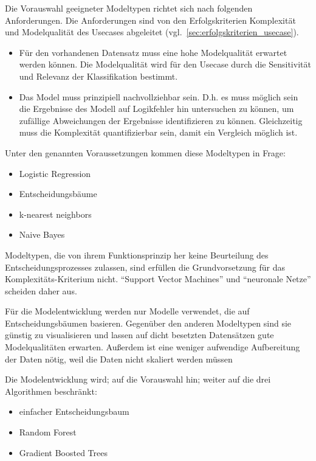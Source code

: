 Die Vorauswahl geeigneter Modeltypen richtet sich nach folgenden Anforderungen. Die Anforderungen sind von den Erfolgskriterien Komplexität und Modelqualität des Usecases abgeleitet (vgl.~\cref{sec:erfolgskriterien_usecase}).

\begin{itemize}
    \item Für den vorhandenen Datensatz muss eine hohe Modelqualität erwartet werden können. Die Modelqualität wird für den Usecase durch die Sensitivität und Relevanz der Klassifikation bestimmt.
    \item Das Model muss prinzipiell nachvollziehbar sein. D.h. es muss möglich sein die Ergebnisse des Modell auf Logikfehler hin untersuchen zu können, um zufällige Abweichungen der Ergebnisse identifizieren zu können. Gleichzeitig muss die Komplexität quantifizierbar sein, damit ein Vergleich möglich ist.
\end{itemize}

Unter den genannten Voraussetzungen kommen diese Modeltypen in Frage:
\begin{itemize}
    \item Logistic Regression
    \item Entscheidungsbäume
    \item k-nearest neighbors
    \item Naive Bayes
\end{itemize}

Modeltypen, die von ihrem Funktionsprinzip her keine Beurteilung des Entscheidungsprozesses zulassen, sind erfüllen die Grundvorsetzung für das Komplexitäts-Kriterium nicht. \enquote{Support Vector Machines} und \enquote{neuronale Netze} scheiden daher aus.

Für die Modelentwicklung werden nur Modelle verwendet, die auf Entscheidungsbäumen basieren. Gegenüber den anderen Modeltypen sind sie günstig zu visualisieren und lassen auf dicht besetzten Datensätzen gute Modelqualitäten erwarten. Außerdem ist eine weniger aufwendige Aufbereitung der Daten nötig, weil die Daten nicht skaliert werden müssen~\cite[S.~84--85]{Muller.2017}

Die Modelentwicklung wird; auf die Vorauswahl hin; weiter auf die drei Algorithmen beschränkt:
\begin{itemize}
    \item einfacher Entscheidungsbaum
    \item Random Forest
    \item Gradient Boosted Trees
\end{itemize}
